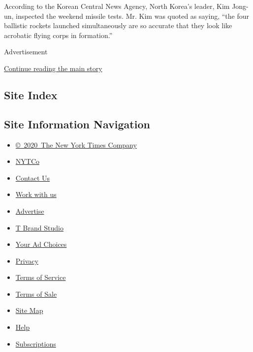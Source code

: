 According to the Korean Central News Agency, North Korea's leader, Kim
Jong-un, inspected the weekend missile tests. Mr. Kim was quoted as
saying, ``the four ballistic rockets launched simultaneously are so
accurate that they look like acrobatic flying corps in formation.''

Advertisement

\protect\hyperlink{after-bottom}{Continue reading the main story}

\hypertarget{site-index}{%
\subsection{Site Index}\label{site-index}}

\hypertarget{site-information-navigation}{%
\subsection{Site Information
Navigation}\label{site-information-navigation}}

\begin{itemize}
\tightlist
\item
  \href{https://help.nytimes.com/hc/en-us/articles/115014792127-Copyright-notice}{©~2020~The
  New York Times Company}
\end{itemize}

\begin{itemize}
\tightlist
\item
  \href{https://www.nytco.com/}{NYTCo}
\item
  \href{https://help.nytimes.com/hc/en-us/articles/115015385887-Contact-Us}{Contact
  Us}
\item
  \href{https://www.nytco.com/careers/}{Work with us}
\item
  \href{https://nytmediakit.com/}{Advertise}
\item
  \href{http://www.tbrandstudio.com/}{T Brand Studio}
\item
  \href{https://www.nytimes.com/privacy/cookie-policy\#how-do-i-manage-trackers}{Your
  Ad Choices}
\item
  \href{https://www.nytimes.com/privacy}{Privacy}
\item
  \href{https://help.nytimes.com/hc/en-us/articles/115014893428-Terms-of-service}{Terms
  of Service}
\item
  \href{https://help.nytimes.com/hc/en-us/articles/115014893968-Terms-of-sale}{Terms
  of Sale}
\item
  \href{https://spiderbites.nytimes.com}{Site Map}
\item
  \href{https://help.nytimes.com/hc/en-us}{Help}
\item
  \href{https://www.nytimes.com/subscription?campaignId=37WXW}{Subscriptions}
\end{itemize}
